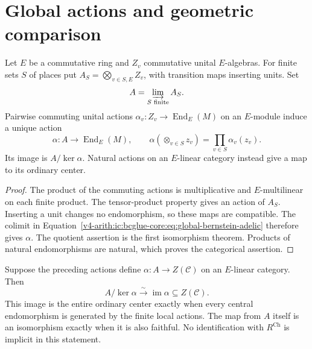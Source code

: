 \section{Global actions and geometric comparison}
\label{v4-arith:ic:bcglue-core:global}

\begin{proposition}
\label{v4-arith:ic:bcglue-core:thm:colimit-to-global-reduces-to-AG}
Let $E$ be a commutative ring and $Z_v$ commutative unital
$E$-algebras. For finite sets $S$ of places put
$A_S=\bigotimes_{v\in S,E}Z_v$, with transition maps inserting
units. Set
\begin{equation}
\label{v4-arith:ic:bcglue-core:eq:global-bernstein-adelic}
 A=\varinjlim_{S\text{ finite}} A_S.
\end{equation}
Pairwise commuting unital actions
$\alpha_v:Z_v\to\operatorname{End}_E(M)$ on an $E$-module
induce a unique action
\[
 \alpha:A\to\operatorname{End}_E(M),\qquad
 \alpha(\otimes_{v\in S}z_v)=\prod_{v\in S}\alpha_v(z_v).
\]
Its image is $A/\ker\alpha$. Natural actions on an $E$-linear
category instead give a map to its ordinary center.
\end{proposition}

\begin{proof}
The product of the commuting actions is multiplicative and
$E$-multilinear on each finite product. The tensor-product property
gives an action of $A_S$. Inserting a unit changes no endomorphism,
so these maps are compatible. The colimit in
Equation~\eqref{v4-arith:ic:bcglue-core:eq:global-bernstein-adelic}
therefore gives $\alpha$.
The quotient assertion is the first isomorphism theorem.
Products of natural endomorphisms are natural, which proves the
categorical assertion.
\end{proof}

\begin{proposition}
\label{v4-arith:ic:bcglue-core:thm:global-bernstein-chenevier}
Suppose the preceding actions define
$\alpha:A\to Z(\mathcal C)$ on an $E$-linear category.
Then
\begin{equation}
\label{v4-arith:ic:bcglue-core:eq:global-bernstein-chenevier}
 A/\ker\alpha\xrightarrow{\sim}\operatorname{im}\alpha
       \subseteq Z(\mathcal C).
\end{equation}
This image is the entire ordinary center exactly when every
central endomorphism is generated by the finite local actions.
The map from $A$ itself is an isomorphism exactly when it is
also faithful. No identification with $R^{\mathrm{Ch}}$ is
implicit in this statement.
\end{proposition}

